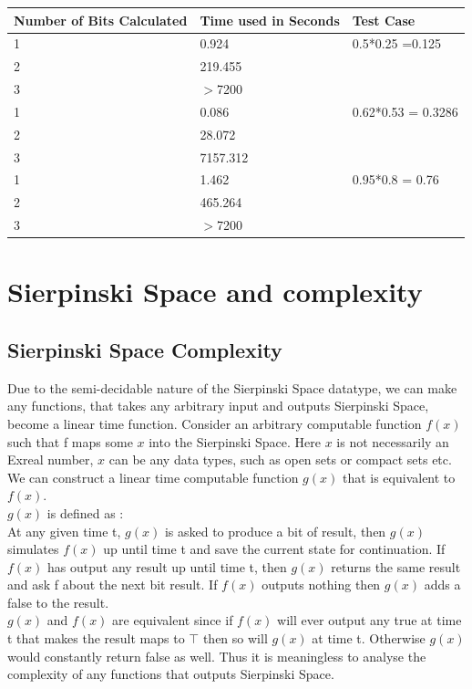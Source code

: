 \documentclass[12pt,twoside,notitlepage]{report}
\begin{document}
\begin{longtable}{| l | l | l |}
	\hline
    	Number of Bits Calculated & Time used in Seconds & Test Case \\ \hline
	1 & 0.924 & 0.5*0.25 =0.125 \\ \hline
	2 & 219.455 & \\ \hline
	3 & $>$7200 & \\ \hline
	1 & 0.086 & 0.62*0.53 = 0.3286\\ \hline
	2 & 28.072 & \\ \hline
	3 & 7157.312 & \\ \hline
	1 & 1.462 & 0.95*0.8 = 0.76 \\ \hline
	2 & 465.264 & \\ \hline
	3 & $>$7200 & \\ \hline
\end{longtable}






\section{Sierpinski Space and complexity}
\subsection{Sierpinski Space Complexity}

Due to the semi-decidable nature of the Sierpinski Space datatype, we can make any functions, that takes any arbitrary input and outputs Sierpinski Space, become a linear time function\cite{pauly-kawamura-arxiv}. Consider an arbitrary computable function $f(x)$ such that f maps some $x$ into the Sierpinski Space.  Here $x$ is not necessarily an Exreal number, $x$ can be any data types, such as open sets or compact sets etc. We can construct a linear time computable function $g(x)$ that is equivalent to $f(x)$. \\
$g(x)$ is defined as : \\
At any given time t, $g(x)$ is asked to produce a bit of result, then $g(x)$ simulates $f(x)$ up until time t and save the current state for continuation. If $f(x)$ has output any result up until time t, then $g(x)$ returns the same result and ask f about the next bit result. If $f(x)$ outputs nothing then $g(x)$ adds a false to the result.\\
$g(x)$ and $f(x)$ are equivalent since if $f(x)$ will ever output any true at time t that makes the result maps to $\top$ then so will $g(x)$ at time t. Otherwise $g(x)$ would constantly return false as well. Thus it is meaningless to analyse the complexity of any functions that outputs Sierpinski Space. 
\end{document}
